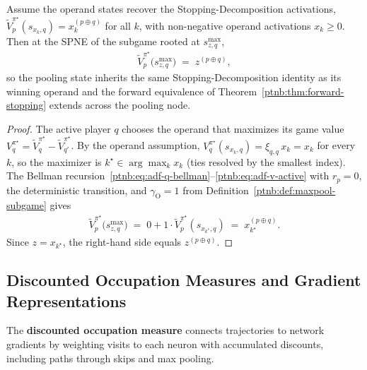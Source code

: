 \begin{proposition}\label{ptnb:prop:maxpool-equivalence}
Assume the operand states recover the Stopping-Decomposition activations, $\tilde
    V_p^{\pi^\star}(s_{x_k,q}) = x_k^{(p\oplus q)}$ for all $k$, with non-negative operand activations
$x_k \ge 0$. Then at the SPNE of the subgame rooted at $s_{z,q}^{\max}$,
\begin{align}
    \tilde V_p^{\pi^\star}\bigl(s_{z,q}^{\max}\bigr) \;=\; z^{(p\oplus q)},
\end{align}
so the pooling state inherits the same Stopping-Decomposition identity as its winning operand and
the forward equivalence of Theorem~\ref{ptnb:thm:forward-stopping} extends across the pooling node.\end{proposition}

\begin{proof}
The active player $q$ chooses the operand that maximizes its game value $V_q^{\pi^\star} = \tilde
    V_q^{\pi^\star} - \tilde V_{q'}^{\pi^\star}$. By the operand assumption,
$V_q^{\pi^\star}(s_{x_k,q}) = \xi_{q,q}\, x_k = x_k$ for every $k$, so the maximizer is $k^\star
    \in \arg\max_k x_k$ (ties resolved by the smallest index). The Bellman
recursion~\eqref{ptnb:eq:adf-q-bellman}--\eqref{ptnb:eq:adf-v-active} with $r_p = 0$, the deterministic
transition, and $\gamma_{\mathrm{O}} = 1$ from Definition~\ref{ptnb:def:maxpool-subgame} gives
\begin{align}
    \tilde V_p^{\pi^\star}\bigl(s_{z,q}^{\max}\bigr) \;=\; 0 + 1 \cdot \tilde
    V_p^{\pi^\star}(s_{x_{k^\star},q}) \;=\; x_{k^\star}^{(p\oplus q)}.
\end{align}
Since $z = x_{k^\star}$, the right-hand side equals $z^{(p\oplus q)}$.
\end{proof}

\subsection{Discounted Occupation Measures and Gradient Representations}\label{ptnb:app:occ-deriv}\label{subsec:gradient_occupation}

The \textbf{discounted occupation measure} connects trajectories to network gradients by weighting
visits to each neuron with accumulated discounts, including paths through skips and max pooling.

